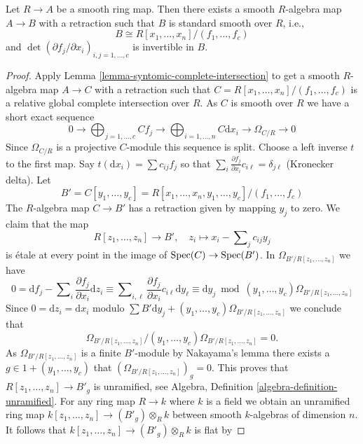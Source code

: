 \begin{lemma}
\label{lemma-smooth-standard-smooth}
Let $R \to A$ be a smooth ring map. Then there exists a smooth $R$-algebra
map $A \to B$ with a retraction such that $B$ is standard smooth over
$R$, i.e.,
$$
B \cong R[x_1, \ldots, x_n]/(f_1, \ldots, f_c)
$$
and $\det(\partial f_j/\partial x_i)_{i, j = 1, \ldots, c}$
is invertible in $B$.
\end{lemma}

\begin{proof}
Apply Lemma \ref{lemma-syntomic-complete-intersection}
to get a smooth $R$-algebra map $A \to C$ with a retraction such that
$C = R[x_1, \ldots, x_n]/(f_1, \ldots, f_c)$
is a relative global complete intersection over $R$. As $C$ is smooth
over $R$ we have a short exact sequence
$$
0 \to
\bigoplus\nolimits_{j = 1, \ldots, c} C f_j \to
\bigoplus\nolimits_{i = 1, \ldots, n} C\text{d}x_i \to
\Omega_{C/R} \to 0
$$
Since $\Omega_{C/R}$ is a projective $C$-module this sequence is split.
Choose a left inverse $t$ to the first map. Say
$t(\text{d}x_i) = \sum c_{ij} f_j$
so that $\sum_i \frac{\partial f_j}{\partial x_i} c_{i\ell} = \delta_{j\ell}$
(Kronecker delta). Let
$$
B' = C[y_1, \ldots, y_c] =
R[x_1, \ldots, x_n, y_1, \ldots, y_c]/(f_1, \ldots, f_c)
$$
The $R$-algebra map $C \to B'$ has a retraction given by mapping $y_j$ to zero.
We claim that the map
$$
R[z_1, \ldots, z_n] \longrightarrow B',\quad
z_i \longmapsto x_i - \sum\nolimits_j c_{ij} y_j
$$
is \'etale at every point in the image of $\mathop{\mathrm{Spec}}(C) \to \mathop{\mathrm{Spec}}(B')$.
In $\Omega_{B'/R[z_1, \ldots, z_n]}$ we have
$$
0 =
\text{d}f_j - \sum\nolimits_i \frac{\partial f_j}{\partial x_i} \text{d}z_i
\equiv
\sum\nolimits_{i, \ell}
\frac{\partial f_j}{\partial x_i} c_{i\ell} \text{d}y_\ell
\equiv
\text{d}y_j \bmod (y_1, \ldots, y_c)\Omega_{B'/R[z_1, \ldots, z_n]}
$$
Since $0 = \text{d}z_i = \text{d}x_i$ modulo
$\sum B'\text{d}y_j + (y_1, \ldots, y_c)\Omega_{B'/R[z_1, \ldots, z_n]}$
we conclude that
$$
\Omega_{B'/R[z_1, \ldots, z_n]}/
(y_1, \ldots, y_c)\Omega_{B'/R[z_1, \ldots, z_n]} = 0.
$$
As $\Omega_{B'/R[z_1, \ldots, z_n]}$ is a finite $B'$-module
by Nakayama's lemma there exists a $g \in 1 + (y_1, \ldots, y_c)$
that $(\Omega_{B'/R[z_1, \ldots, z_n]})_g = 0$. This proves that
$R[z_1, \ldots, z_n] \to B'_g$ is unramified, see
Algebra, Definition \ref{algebra-definition-unramified}.
For any ring map $R \to k$ where $k$ is a field we obtain an
unramified ring map $k[z_1, \ldots, z_n] \to (B'_g) \otimes_R k$
between smooth $k$-algebras of dimension $n$. It follows that
$k[z_1, \ldots, z_n] \to (B'_g) \otimes_R k$ is flat by

\end{proof}
